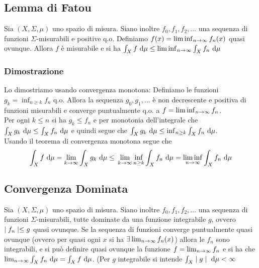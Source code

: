\documentclass[a4paper,NoNotes,GeneralMath]{stdmdoc}
\begin{document}
	\subsection*{Lemma di Fatou}
	Sia $(X, \Sigma, \mu)$ uno spazio di misura. Siano inoltre $f_0, f_1, f_2, \ldots$ una sequenza di funzioni $\Sigma$-misurabili e positive q.o. Definiamo $f(x) = \liminf_{n \rightarrow \infty} f_n(x)$ quasi ovunque. Allora $f$ è misurabile e si ha $\int_X f \de \mu \le \liminf_{n \rar \infty} \int_X f_n \de \mu$
	
	\subsubsection*{Dimostrazione}
	Lo dimostriamo usando convergenza monotona: Definiamo le funzioni $g_k = \inf_{n \ge k} f_n$ q.o. Allora la sequenza $g_0, g_1, \ldots$ è non decrescente e positiva di funzioni misurabili e converge puntualmente q.o. a $f = \liminf_{n \rightarrow \infty} f_n$. \\
	Per ogni $k \le n$ si ha $g_k \le f_n$ e per monotonia dell'integrale che $\int_X g_k \de \mu \le \int_X f_n \de \mu$ e quindi segue che $\int_X g_k \de \mu \le \inf_{n \ge k} \int_X f_n \de \mu$. \\
	Usando il teorema di convergenza monotona segue che $$\int_X f \de \mu = \lim_{k \rar \infty} \int_X g_k \de \mu \le \newline
	\lim_{k \rar \infty} \inf_{n \ge k} \int_X f_n \de \mu = \liminf_{n \rar \infty} \int_X f_n \de \mu$$
	
	\subsection*{Convergenza Dominata}
	Sia $(X, \Sigma, \mu)$ uno spazio di misura. Siano inoltre $f_0, f_1, f_2, \ldots$ una sequenza di funzioni $\Sigma$-misurabili, tutte dominate da una funzione integrabile $g$, ovvero $\mid f_n \mid \le g$ quasi ovunque. Se la sequenza di funzioni converge puntualmente quasi ovunque (ovvero per quasi ogni $x$ si ha $\exists \lim_{n \rightarrow \infty} f_n(x)$) allora le $f_n$ sono integrabili, e si può definire quasi ovunque la funzione $f = \lim_{n \rightarrow \infty} f_n$ e si ha che $\lim_{n \rar \infty} \int_X f_n \de \mu = \int_X f \de \mu$. (Per $g$ integrabile si intende $\int_X \abs{g} \de \mu < \infty$
	
\end{document}
